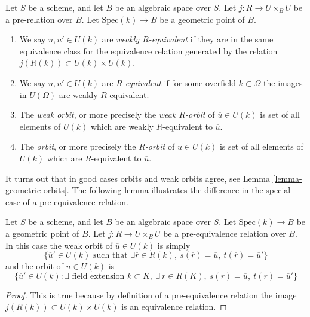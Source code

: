 \begin{definition}
\label{definition-geometric-orbits}
Let $S$ be a scheme, and let $B$ be an algebraic space over $S$.
Let $j : R \to U \times_B U$ be a pre-relation over $B$.
Let $\text{Spec}(k) \to B$ be a geometric point of $B$.
\begin{enumerate}
\item We say $\overline{u}, \overline{u}' \in U(k)$ are
{\it weakly $R$-equivalent} if they are in the same equivalence class
for the equivalence relation generated by the relation
$j(R(k)) \subset U(k) \times U(k)$.
\item We say $\overline{u}, \overline{u}' \in U(k)$ are
{\it $R$-equivalent} if for some overfield $k \subset \Omega$
the images in $U(\Omega)$ are weakly $R$-equivalent.
\item The {\it weak orbit}, or more precisely the {\it weak $R$-orbit}
of $\overline{u} \in U(k)$ is set of all
elements of $U(k)$ which are weakly $R$-equivalent to $\overline{u}$.
\item The {\it orbit}, or more precisely the {\it $R$-orbit}
of $\overline{u} \in U(k)$ is set of all
elements of $U(k)$ which are $R$-equivalent to $\overline{u}$.
\end{enumerate}
\end{definition}

\noindent
It turns out that in good cases orbits and weak orbits agree, see
Lemma \ref{lemma-geometric-orbits}. The following lemma illustrates
the difference in the special case of a pre-equivalence relation.

\begin{lemma}
\label{lemma-weak-orbit-pre-equivalence}
Let $S$ be a scheme, and let $B$ be an algebraic space over $S$.
Let $\text{Spec}(k) \to B$ be a geometric point of $B$.
Let $j : R \to U \times_B U$ be a pre-equivalence relation over $B$.
In this case the weak orbit of $\overline{u} \in U(k)$ is simply
$$
\{
\overline{u}' \in U(k)
\text{ such that }
\exists \overline{r} \in R(k),
\ s(\overline{r}) = \overline{u},
\ t(\overline{r}) = \overline{u}'
\}
$$
and the orbit of $\overline{u} \in U(k)$ is
$$
\{
\overline{u}' \in U(k) :
\exists\text{ field extension }k \subset K, \ \exists\ r \in R(K),
\ s(r) = \overline{u}, \ t(r) = \overline{u}'\}
$$
\end{lemma}

\begin{proof}
This is true because by definition of a pre-equivalence relation the image
$j(R(k)) \subset U(k) \times U(k)$ is an equivalence relation.
\end{proof}

